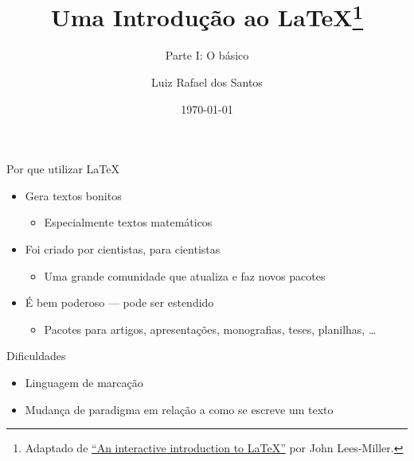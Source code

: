 \documentclass{beamer}
\title[Introdução ao \LaTeX]{Uma Introdução  ao \LaTeX\thanks{Adaptado de
\href{https://docs.google.com/file/d/0B1WX73woAuwgR2hHTE9ybmk1WG8/edit}{``An
interactive introduction to \LaTeX''} por John Lees-Miller.}}
\subtitle{Parte I: O básico}
\author{Luiz Rafael dos Santos}
\institute{IFC-Camboriú}
\date{\today}
\begin{document}
 
 
\begin{frame}
\titlepage
\end{frame}
 
\begin{frame}{Por que utilizar \LaTeX}

\begin{itemize}
  \item Gera  textos bonitos
  \begin{itemize}
  \item Especialmente textos matemáticos
\end{itemize}
  \item Foi criado por cientistas, para cientistas
  \begin{itemize}
  \item Uma grande comunidade que atualiza e faz novos pacotes
\end{itemize}
  \item É bem poderoso --- pode ser estendido
  \begin{itemize}
  \item Pacotes para artigos, apresentações, monografias, teses, planilhas, \ldots
\end{itemize}
\end{itemize}


\begin{block}{Dificuldades}
\begin{itemize}
  \item Linguagem de marcação
  \item Mudança de paradigma em relação a como se escreve um texto
\end{itemize}
\end{block}

\end{frame}

\end{document}
